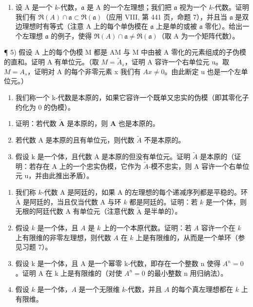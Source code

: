 \begin{enumerate}
\def\labelenumi{\arabic{enumi})}
\setcounter{enumi}{3}
\tightlist
\item
  设 A 是一个 \(k\)-代数，\(\mathfrak{a}\) 是 A 的一个左理想；我们把 \(\mathfrak{a}\) 视为一个 \(k\)-代数。证明我们有 \(\Re(A) \cap \mathfrak{a} \subset \Re(\mathfrak{a})\)（应用 VIII, 第 441 页，命题 7），并且当 \(\mathfrak{a}\) 是双边理想时有等式（注意 A 上的每个单伪模在 \(\mathfrak{a}\) 上是单的或被 \(\mathfrak{a}\) 零化）。给出一个左理想 \(\mathfrak{a}\) 的例子，使得 \(\Re(A) \cap \mathfrak{a} \neq \Re(\mathfrak{a})\)（取 A 为一个矩阵代数）。
\end{enumerate}

¶ 5) 假设 A 上的每个伪模 M 都是 AM 与 M 中由被 A 零化的元素组成的子伪模的直和。证明 A 有单位元。（取 \(M = \widetilde{A}_{s}\)，证明 A 容许一个右单位元 u。取 \(M = A_{s}\)，证明对 A 的每个非零元素 x 我们有 \(Ax \neq 0\)。由此断定 u 也是一个左单位元。）

\begin{enumerate}
\def\labelenumi{\arabic{enumi})}
\setcounter{enumi}{5}
\tightlist
\item
  我们称一个 k-代数是本原的，如果它容许一个既单又忠实的伪模（即其零化子约化为 0 的伪模）。
\end{enumerate}

\begin{enumerate}
\def\labelenumi{\alph{enumi})}
\item
  证明：若代数 \(\tilde{\mathbf{A}}\) 是本原的，则 \(\mathbf{A}\) 也是本原的。
\item
  若代数 A 是本原的且有单位元，则代数 \(\widetilde{A}\) 不是本原的。
\item
  假设 k 是一个体，且代数 A 是本原的但没有单位元。证明 \(\widetilde{A}\) 是本原的（证明：若存在 A 上的一个忠实伪模，它作为 \(\widetilde{A}\)-模不忠实，则 A 容许一个右单位元 u，并由此推出矛盾）。
\end{enumerate}

\begin{enumerate}
\def\labelenumi{\arabic{enumi})}
\setcounter{enumi}{6}
\item
  我们称 \(k\)-代数 A 是阿廷的，如果 A 的左理想的每个递减序列都是平稳的。环 \(\widetilde{\mathrm{A}}\) 是阿廷的，当且仅当代数 A 与环 \(k\) 都是阿廷的。证明：若 \(k\) 是一个体，则无根的阿廷代数 A 有单位元（注意代数 \(\widetilde{\mathrm{A}}\) 是半单的）。
\item
  假设 \(k\) 是一个体，且 \(A\) 是 \(k\) 上的一个本原代数。证明：若 \(A\) 容许一个在 \(k\) 上有限维的非零左理想，则代数 \(A\) 在 \(k\) 上是有限维的，从而是一个单环（参见习题 7）。
\item
  假设 k 是一个体，且 A 是一个幂零 k-代数，即存在一个整数 n 使得 \(A^{n}=0\)。证明 A 在 k 上是有限维的（对使 \(A^{n}=0\) 的最小整数 n 用归纳法）。
\item
  假设 \(k\) 是一个体，\(A\) 是一个无限维 \(k\)-代数，并且 \(A\) 的每个真左理想都在 \(k\) 上有限维。
\end{enumerate}

